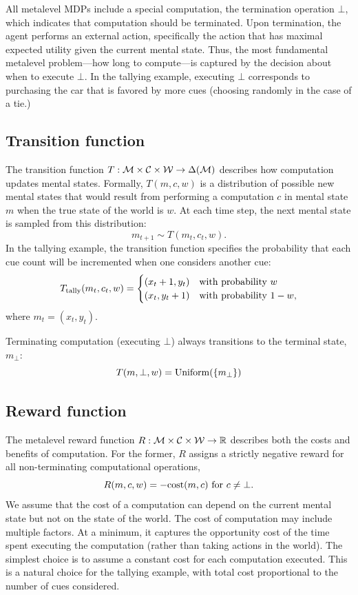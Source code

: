 All metalevel MDPs include a special computation, the termination operation $\bot$, which indicates that computation should be terminated. Upon termination, the agent performs an external action, specifically the action that has maximal expected utility given the current mental state. Thus, the most fundamental metalevel problem---how long to compute---is captured by the decision about when to execute $\bot$. In the tallying example, executing $\bot$ corresponds to purchasing the car that is favored by more cues (choosing randomly in the case of a tie.)

\subsection{Transition function}
The transition function $T: \mathcal{M} \times \mathcal{C} \times \mathcal{W} \rightarrow \Delta(\mathcal{M})$ describes how computation updates mental states. Formally, $T(m, c, w)$ is a distribution of possible new mental states that would result from performing a computation $c$ in mental state $m$ when the true state of the world is $w$. At each time step, the next mental state is sampled from this distribution:
\begin{equation}\label{eq:transition}
m_{t+1} \sim T(m_t, c_t, w).
\end{equation}
In the tallying example, the transition function specifies the probability that each cue count will be incremented when one considers another cue:
\begin{equation}\label{eq:tally-transition}
  T_{\text{tally}}(m_t, c_t, w) = \begin{cases}
    (x_t + 1, y_t) &\text{with probability } w  \\
    (x_t, y_t + 1) &\text{with probability } 1-w,
  \end{cases}
\end{equation}
where $m_t = (x_t, y_t)$.

Terminating computation (executing $\bot$) always transitions to the terminal state, $m_\bot$:
%
\begin{equation}
  T(m, \bot, w) = \mathrm{Uniform}(\{m_\bot\})
\end{equation}

\subsection{Reward function}
The metalevel reward function $R: \mathcal{M} \times \mathcal{C} \times \mathcal{W} \rightarrow \mathbb{R}$ describes both the costs and benefits of computation. For the former, $R$ assigns a strictly negative reward for all non-terminating computational operations,
%
\begin{equation}
R(m, c, w) = -\text{cost}(m, c) \text{ for } c \neq \bot.
\end{equation}
%
We assume that the cost of a computation can depend on the current mental state but not on the state of the world. The cost of computation may include multiple factors. At a minimum, it captures the opportunity cost of the time spent executing the computation (rather than taking actions in the world). The simplest choice is to assume a constant cost for each computation executed. This is a natural choice for the tallying example, with total cost proportional to the number of cues considered.

